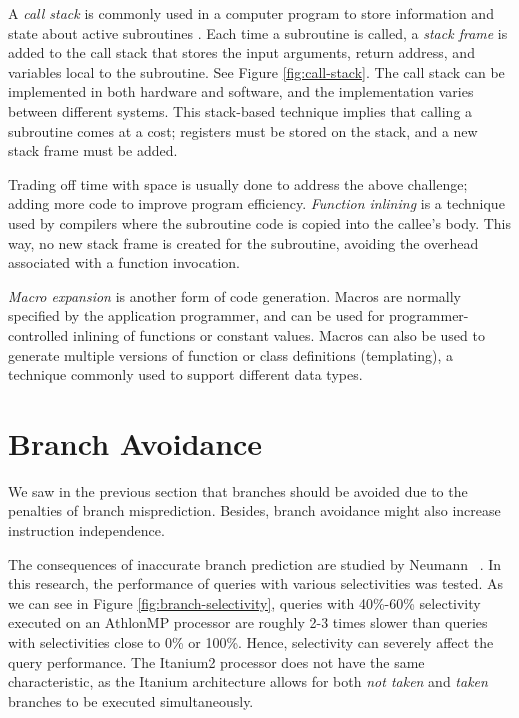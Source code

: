 A \textit{call stack} is commonly used in a computer program to store information and state about active subroutines \cite{Wikipedia_contributors2015-od}. Each time a subroutine is called, a \textit{stack frame} is added to the call stack that stores the input arguments, return address, and variables local to the subroutine. See Figure \ref{fig:call-stack}. The call stack can be implemented in both hardware and software, and the implementation varies between different systems. This stack-based technique implies that calling a subroutine comes at a cost; registers must be stored on the stack, and a new stack frame must be added.

Trading off time with space is usually done to address the above challenge; adding more code to improve program efficiency. \textit{Function inlining} is a technique used by compilers where the subroutine code is copied into the callee's body. This way, no new stack frame is created for the subroutine, avoiding the overhead associated with a function invocation.

\textit{Macro expansion} is another form of code generation. Macros are normally specified by the application programmer, and can be used for programmer-controlled inlining of functions or constant values. Macros can also be used to generate multiple versions of function or class definitions (templating), a technique commonly used to support different data types.

\section{Branch Avoidance}
\label{sec:Branch Avoidance}

We saw in the previous section that branches should be avoided due to the penalties of branch misprediction. Besides, branch avoidance might also increase instruction independence.

The consequences of inaccurate branch prediction are studied by Neumann \ea~\cite{Neumann2011-uq}. In this research, the performance of queries with various selectivities was tested. As we can see in Figure \ref{fig:branch-selectivity}, queries with 40\%-60\% selectivity executed on an AthlonMP processor are roughly 2-3 times slower than queries with selectivities close to 0\% or 100\%. Hence, selectivity can severely affect the query performance. The Itanium2 processor does not have the same characteristic, as the Itanium architecture allows for both \textit{not taken} and \textit{taken} branches to be executed simultaneously.

